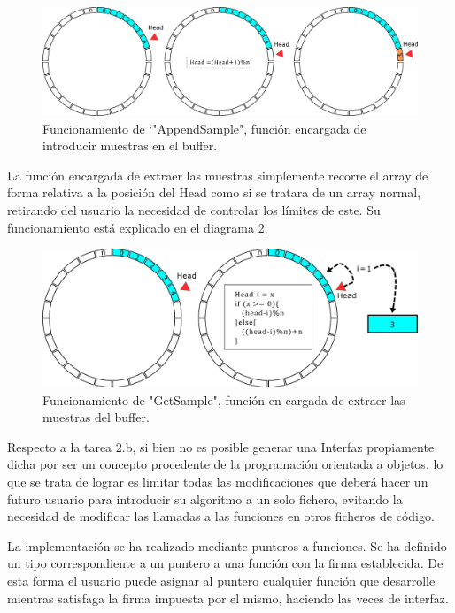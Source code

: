         \begin{figure}[H] 
                \centering
                        \includegraphics[width = \linewidth]{figuras/bufferAppend.png}
                \caption{Funcionamiento de \char`"AppendSample", función encargada de introducir muestras en el buffer.}
                \label{fig:bufferDiagramAppend}
        \end{figure}
        
        La función encargada de extraer las muestras simplemente recorre el array de forma relativa a la posición del Head como si se tratara de un array normal, retirando del usuario la necesidad de controlar los límites de este. Su funcionamiento está explicado en el diagrama \ref{fig:bufferDiagramGet}.
        
        \begin{figure}[H]
                \centering
                        \includegraphics[width = 0.9 \linewidth]{figuras/bufferGet.png}
                \caption{Funcionamiento de "GetSample", función en cargada de extraer las muestras del buffer.}
                \label{fig:bufferDiagramGet}
        \end{figure}
        
        Respecto a la tarea 2.b, si bien no es posible generar una Interfaz propiamente dicha por ser un concepto procedente de la programación orientada a objetos, lo que se trata de lograr es limitar todas las modificaciones que deberá hacer un futuro usuario para introducir su algoritmo a un solo fichero, evitando la necesidad de modificar las llamadas a las funciones en otros ficheros de código. 

        La implementación se ha realizado mediante punteros a funciones. Se ha definido un tipo correspondiente a un puntero a una función con la firma establecida. De esta forma el usuario puede asignar al puntero cualquier función que desarrolle mientras satisfaga la firma impuesta por el mismo, haciendo las veces de interfaz.
        
